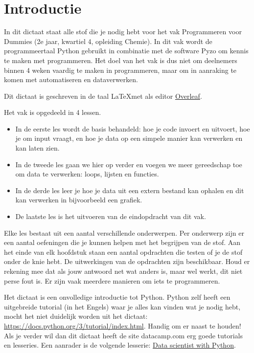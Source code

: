 \chapter*{Introductie}
In dit dictaat staat alle stof die je nodig hebt voor het vak Programmeren voor Dummies (2e jaar, kwartiel 4, opleiding Chemie). In dit vak wordt de programmeertaal Python gebruikt in combinatie met de software Pyzo om kennis te maken met programmeren. Het doel van het vak is dus niet om deelnemers binnen 4 weken vaardig te maken in programmeren, maar om in aanraking te komen met automatiseren en dataverwerken. 

Dit dictaat is geschreven in de taal \LaTeX met als editor \href{https://www.overleaf.com}{Overleaf}. 

Het vak is opgedeeld in 4 lessen.
\begin{itemize}
\item In de eerste les wordt de basis behandeld: hoe je code invoert en uitvoert, hoe je om input vraagt, en hoe je data op een simpele manier kan verwerken en kan laten zien. 
\item In de tweede les gaan we hier op verder en voegen we meer gereedschap toe om data te verwerken: loops, lijsten en functies. 
\item In de derde les leer je hoe je data uit een extern bestand kan ophalen en dit kan verwerken in bijvoorbeeld een grafiek. 
\item De laatste les is het uitvoeren van de eindopdracht van dit vak. 
\end{itemize}

Elke les bestaat uit een aantal verschillende onderwerpen. Per onderwerp zijn er een aantal oefeningen die je kunnen helpen met het begrijpen van de stof. Aan het einde van elk hoofdstuk staan een aantal opdrachten die testen of je de stof onder de knie hebt. De uitwerkingen van de opdrachten zijn beschikbaar. Houd er rekening mee dat als jouw antwoord net wat anders is, maar wel werkt, dit niet perse fout is. Er zijn vaak meerdere manieren om iets te programmeren.

Het dictaat is een onvolledige introductie tot Python. Python zelf heeft een uitgebreide tutorial (in het Engels) waar je alles kan vinden wat je nodig hebt, mocht het niet duidelijk worden uit het dictaat: \href{https://docs.python.org/3/tutorial/index.html}{https://docs.python.org/3/tutorial/index.html}. Handig om er naast te houden! Als je verder wil dan dit dictaat heeft de site datacamp.com erg goede tutorials en lesseries. Een aanrader is de volgende lesserie:
\href{https://www.datacamp.com/tracks/data-scientist-with-python}{Data scientist with Python}.


